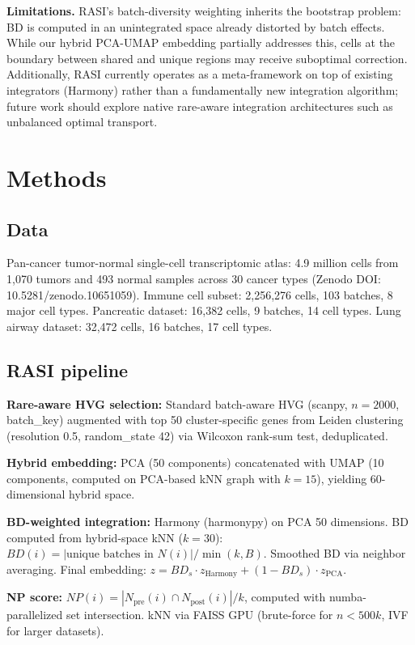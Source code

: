 \documentclass[10pt]{article}
\begin{document}
\textbf{Limitations.} RASI's batch-diversity weighting inherits the bootstrap problem: BD is computed in an unintegrated space already distorted by batch effects. While our hybrid PCA-UMAP embedding partially addresses this, cells at the boundary between shared and unique regions may receive suboptimal correction. Additionally, RASI currently operates as a meta-framework on top of existing integrators (Harmony) rather than a fundamentally new integration algorithm; future work should explore native rare-aware integration architectures such as unbalanced optimal transport.

\section{Methods}

\subsection{Data}
Pan-cancer tumor-normal single-cell transcriptomic atlas\cite{kang2024}: 4.9 million cells from 1,070 tumors and 493 normal samples across 30 cancer types (Zenodo DOI: 10.5281/zenodo.10651059). Immune cell subset: 2,256,276 cells, 103 batches, 8 major cell types. Pancreatic dataset: 16,382 cells, 9 batches, 14 cell types. Lung airway dataset: 32,472 cells, 16 batches, 17 cell types.

\subsection{RASI pipeline}
\textbf{Rare-aware HVG selection:} Standard batch-aware HVG (scanpy, $n=2000$, batch\_key) augmented with top 50 cluster-specific genes from Leiden clustering (resolution 0.5, random\_state 42) via Wilcoxon rank-sum test, deduplicated.

\textbf{Hybrid embedding:} PCA (50 components) concatenated with UMAP (10 components, computed on PCA-based kNN graph with $k=15$), yielding 60-dimensional hybrid space.

\textbf{BD-weighted integration:} Harmony (harmonypy) on PCA 50 dimensions. BD computed from hybrid-space kNN ($k=30$): $BD(i) = |\text{unique batches in } N(i)| / \min(k, B)$. Smoothed BD via neighbor averaging. Final embedding: $z = BD_s \cdot z_{\text{Harmony}} + (1-BD_s) \cdot z_{\text{PCA}}$.

\textbf{NP score:} $NP(i) = |N_{\text{pre}}(i) \cap N_{\text{post}}(i)| / k$, computed with numba-parallelized set intersection. kNN via FAISS GPU (brute-force for $n < 500k$, IVF for larger datasets).
\end{document}
